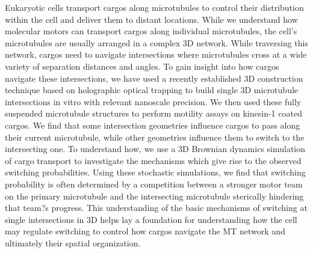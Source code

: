 \thesisabstract
{
Eukaryotic cells transport cargos along microtubules to control their distribution within the cell and deliver them to distant locations. While we understand how molecular motors can transport cargos along individual microtubules, the cell's microtubules are usually arranged in a complex 3D network. While traversing this network, cargos need to navigate intersections where microtubules cross at a wide variety of separation distances and angles. To gain insight into how cargos navigate these intersections, we have used a recently established 3D construction technique based on holographic optical trapping to build single 3D microtubule intersections in vitro with relevant nanoscale precision. We then used these fully suspended microtubule structures to perform motility assays on kinesin-1 coated cargos. We find that some intersection geometries influence cargos to pass along their current microtubule, while other geometries influence them to switch to the intersecting one. To understand how, we use a 3D Brownian dynamics simulation of cargo transport to investigate the mechanisms which give rise to the observed switching probabilities. Using these stochastic simulations, we find that switching probability is often determined by a competition between a stronger motor team on the primary microtubule and the intersecting microtubule sterically hindering that team?s progress. This understanding of the basic mechanisms of switching at single intersections in 3D helps lay a foundation for understanding how the cell may regulate switching to control how cargos navigate the MT network and ultimately their spatial organization.
}


